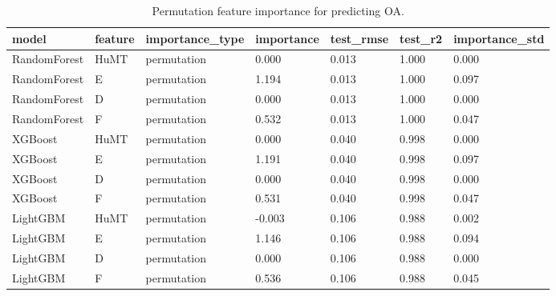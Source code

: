 \begin{table}[t]
\centering
\caption{Permutation feature importance for predicting OA.}
\label{tab:perm_importance}
\begin{tabular}{lllllll}
\toprule
model & feature & importance\_type & importance & test\_rmse & test\_r2 & importance\_std \\
\midrule
RandomForest & HuMT & permutation & 0.000 & 0.013 & 1.000 & 0.000 \\
RandomForest & E & permutation & 1.194 & 0.013 & 1.000 & 0.097 \\
RandomForest & D & permutation & 0.000 & 0.013 & 1.000 & 0.000 \\
RandomForest & F & permutation & 0.532 & 0.013 & 1.000 & 0.047 \\
XGBoost & HuMT & permutation & 0.000 & 0.040 & 0.998 & 0.000 \\
XGBoost & E & permutation & 1.191 & 0.040 & 0.998 & 0.097 \\
XGBoost & D & permutation & 0.000 & 0.040 & 0.998 & 0.000 \\
XGBoost & F & permutation & 0.531 & 0.040 & 0.998 & 0.047 \\
LightGBM & HuMT & permutation & -0.003 & 0.106 & 0.988 & 0.002 \\
LightGBM & E & permutation & 1.146 & 0.106 & 0.988 & 0.094 \\
LightGBM & D & permutation & 0.000 & 0.106 & 0.988 & 0.000 \\
LightGBM & F & permutation & 0.536 & 0.106 & 0.988 & 0.045 \\
\bottomrule
\end{tabular}
\end{table}
